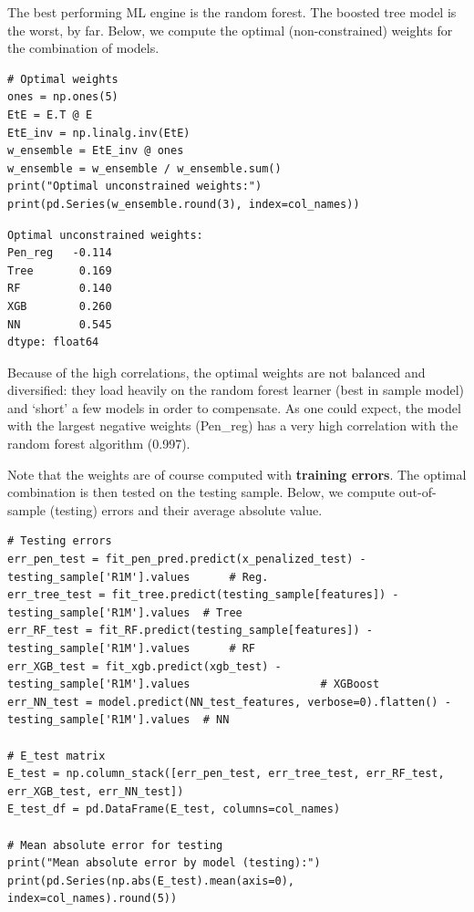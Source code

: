 The best performing ML engine is the random forest. The boosted tree model is the worst, by far. Below, we compute the optimal (non-constrained) weights for the combination of models.

\begin{verbatim}
# Optimal weights
ones = np.ones(5)
EtE = E.T @ E
EtE_inv = np.linalg.inv(EtE)
w_ensemble = EtE_inv @ ones
w_ensemble = w_ensemble / w_ensemble.sum()
print("Optimal unconstrained weights:")
print(pd.Series(w_ensemble.round(3), index=col_names))
\end{verbatim}

\begin{verbatim}
Optimal unconstrained weights:
Pen_reg   -0.114
Tree       0.169
RF         0.140
XGB        0.260
NN         0.545
dtype: float64
\end{verbatim}

Because of the high correlations, the optimal weights are not balanced and diversified: they load heavily on the random forest learner (best in sample model) and `short' a few models in order to compensate. As one could expect, the model with the largest negative weights (Pen\_reg) has a very high correlation with the random forest algorithm (0.997).

Note that the weights are of course computed with \textbf{training errors}. The optimal combination is then tested on the testing sample. Below, we compute out-of-sample (testing) errors and their average absolute value.

\begin{verbatim}
# Testing errors
err_pen_test = fit_pen_pred.predict(x_penalized_test) - testing_sample['R1M'].values      # Reg.
err_tree_test = fit_tree.predict(testing_sample[features]) - testing_sample['R1M'].values  # Tree
err_RF_test = fit_RF.predict(testing_sample[features]) - testing_sample['R1M'].values      # RF
err_XGB_test = fit_xgb.predict(xgb_test) - testing_sample['R1M'].values                    # XGBoost
err_NN_test = model.predict(NN_test_features, verbose=0).flatten() - testing_sample['R1M'].values  # NN

# E_test matrix
E_test = np.column_stack([err_pen_test, err_tree_test, err_RF_test, err_XGB_test, err_NN_test])
E_test_df = pd.DataFrame(E_test, columns=col_names)

# Mean absolute error for testing
print("Mean absolute error by model (testing):")
print(pd.Series(np.abs(E_test).mean(axis=0), index=col_names).round(5))
\end{verbatim}

